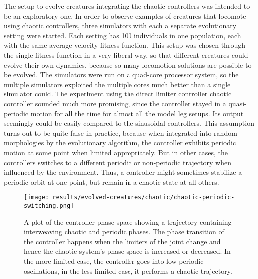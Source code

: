 \documentclass[main]{subfiles}
\begin{document}
The setup to evolve creatures integrating the chaotic controllers was intended to be an exploratory one. %
%
In order to observe examples of creatures that locomote using chaotic controllers, three simulators with each a separate evolutionary setting were started. %
%
Each setting has 100 individuals in one population, each with the same average velocity fitness function. %
%
This setup was chosen through the single fitness function in a very liberal way, so that different creatures could evolve their own dynamics, because so many locomotion solutions are possible to be evolved. %
%
The simulators were run on a quad-core processor system, so the multiple simulators exploited the multiple cores much better than a single simulator could. %
%
The experiment using the direct limiter controller chaotic controller sounded much more promising, since the controller stayed in a quasi-periodic motion for all the time for almost all the model leg setups. %
%
Its output seemingly could be easily compared to the sinusoidal controllers. %
%
This assumption turns out to be quite false in practice, because when integrated into random morphologies by the evolutionary algorithm, the controller exhibits periodic motion at some point when limited appropriately. %
%
But in other cases, the controllers switches to a different periodic or non-periodic trajectory when influenced by the environment. %
% 
Thus, a controller might sometimes stabilize a periodic orbit at one point, but remain in a chaotic state at all others. %

\begin{figure}[H]
\centering
\texttt{[image: results/evolved-creatures/chaotic/chaotic-periodic-switching.png]}
\caption[Chaotic-periodic phase switching]{A plot of the controller phase space showing a trajectory containing interweaving chaotic and periodic phases. The phase transition of the controller happens when the limiters of the joint change and hence the chaotic system's phase space is increased or decreased. In the more limited case, the controller goes into low periodic oscillations, in the less limited case, it performs a chaotic trajectory.}
\label{figure:z-2.4-3.19-chaotictrajectories}
\end{figure}
\end{document}

